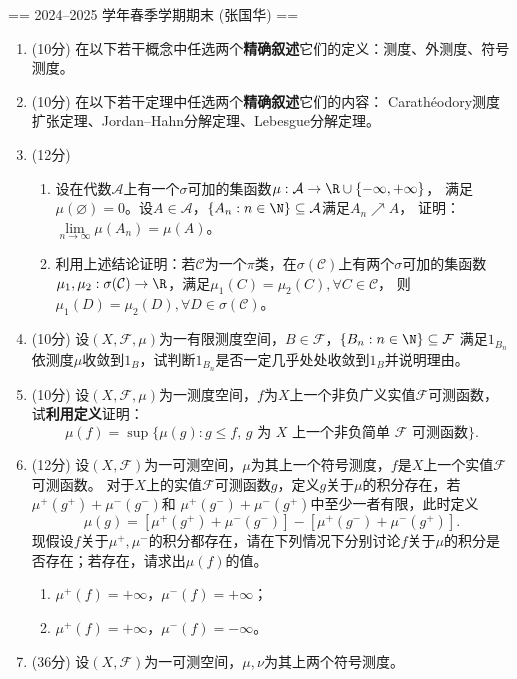 == 2024--2025 学年春季学期期末 (张国华) ==
\begin{enumerate}
    \item (10分) 在以下若干概念中任选两个\textbf{精确叙述}它们的定义：测度、外测度、符号测度。
    \item (10分) 在以下若干定理中任选两个\textbf{精确叙述}它们的内容：
    Carath\'eodory测度扩张定理、Jordan--Hahn分解定理、Lebesgue分解定理。
    \item (12分) 
    \begin{enumerate}[label=(\arabic*)]
        \item 设在代数$\mathcal{A}$上有一个$\sigma$可加的集函数$\mu:\mathcal{A}\to\R\cup\{-\infty,+\infty\}$，
        满足$\mu(\varnothing)=0$。设$A\in\mathcal{A}$，$\{A_n:n\in\N\}\subseteq\mathcal{A}$满足$A_n\nearrow A$，
        证明：$\lim\limits_{n\to\infty}\mu(A_n)=\mu(A)$。
        \item 利用上述结论证明：若$\mathcal{C}$为一个$\pi$类，在$\sigma(\mathcal{C})$上有两个$\sigma$可加的集函数
        $\mu_1,\mu_2:\sigma(\mathcal{C})\to\R$，满足$\mu_1(C)=\mu_2(C),\forall C\in\mathcal{C}$，
        则$\mu_1(D)=\mu_2(D),\forall D\in\sigma(\mathcal{C})$。
    \end{enumerate}
    \item (10分) 设$(X,\mathcal{F},\mu)$为一有限测度空间，$B\in\mathcal{F}$，$\{B_n:n\in\N\}\subseteq\mathcal{F}$
    满足$1_{B_n}$依测度$\mu$收敛到$1_B$，试判断$1_{B_n}$是否一定几乎处处收敛到$1_B$并说明理由。
    \item (10分) 设$(X,\mathcal{F},\mu)$为一测度空间，$f$为$X$上一个非负广义实值$\mathcal{F}$可测函数，
    试\textbf{利用定义}证明：\[\mu(f)=\sup\{\mu(g):g\leqslant f,\,g\text{ 为 $X$ 上一个非负简单 $\mathcal{F}$ 可测函数}\}.\]
    \item (12分) 设$(X,\mathcal{F})$为一可测空间，$\mu$为其上一个符号测度，$f$是$X$上一个实值$\mathcal{F}$可测函数。
    对于$X$上的实值$\mathcal{F}$可测函数$g$，定义$g$关于$\mu$的积分存在，若$\mu^+(g^+)+\mu^-(g^-)$和
    $\mu^+(g^-)+\mu^-(g^+)$中至少一者有限，此时定义\[\mu(g)=[\mu^+(g^+)+\mu^-(g^-)]-[\mu^+(g^-)+\mu^-(g^+)].\]
    现假设$f$关于$\mu^+,\mu^-$的积分都存在，请在下列情况下分别讨论$f$关于$\mu$的积分是否存在；若存在，请求出$\mu(f)$的值。
    \begin{enumerate}[label=(\arabic*)]
        \item $\mu^+(f)=+\infty$，$\mu^-(f)=+\infty$；
        \item $\mu^+(f)=+\infty$，$\mu^-(f)=-\infty$。
    \end{enumerate}
    \item (36分) 设$(X,\mathcal{F})$为一可测空间，$\mu,\nu$为其上两个符号测度。

\end{enumerate}
